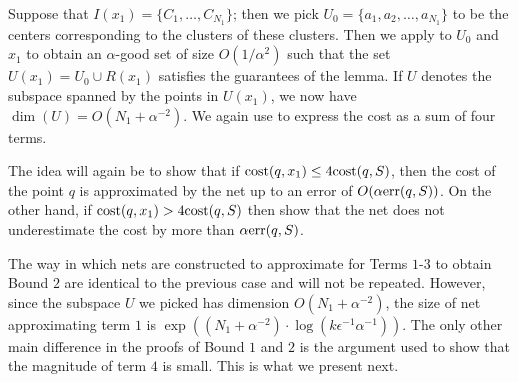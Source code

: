 \documentclass[11pt]{article}
\theoremstyle{restate}
\theoremstyle{definition}
\newcommand{\cost}{\textnormal{cost}}
\newcommand{\err}{\textnormal{err}}
\begin{document}
Suppose that $I(x_1) = \{C_1, \ldots, C_{N_1}\}$; then we pick $U_0 = \{a_1, a_2, \ldots, a_{N_1}\}$ to be the centers corresponding to the clusters of these clusters.  Then we apply  to $U_0$ and $x_1$ to obtain an $\alpha$-good set of size $O(1/\alpha^2)$ such that the set $U(x_1) = U_0 \cup R(x_1)$ satisfies the guarantees of the lemma. If $U$ denotes the subspace spanned by the points in $U(x_1)$, we now have $\dim(U) = O(N_1 + \alpha^{-2})$. We again use  to express the cost as a sum of four terms. 


The idea will again be to show that if $\cost(q,x_1) \leq 4 \cost(q,S)$, then the cost of the point $q$ is approximated by the net up to an error of $O(\alpha \err(q,S))$. On the other hand, if $\cost(q, x_1) > 4 \cost(q,S)$ then show that the net does not underestimate the cost by more than $\alpha \err(q,S)$. 

The way in which nets are constructed to approximate for Terms $1$-$3$ to obtain Bound $2$ are identical to the previous case and will not be repeated. However, since the subspace $U$ we picked has dimension $O(N_1 +\alpha^{-2})$, the size of net approximating term $1$ is $\exp((N_1 + \alpha^{-2}) \cdot \log(k \epsilon^{-1} \alpha^{-1}))$. The only other main difference in the proofs of Bound $1$ and $2$ is the argument used to show that the magnitude of term $4$ is small. This is what we present next. 
\end{document}
